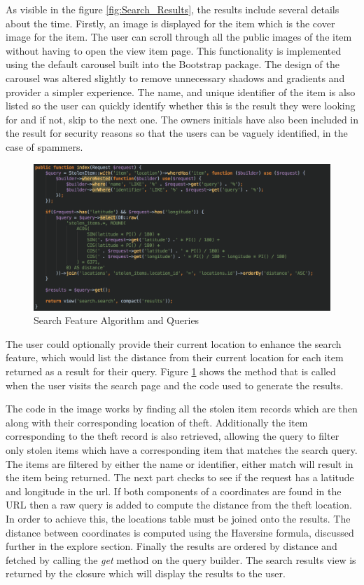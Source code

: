 As visible in the figure \ref{fig:Search_Results}, the results include several details about the time. Firstly, an image is displayed for the item which is the cover image for the item. The user can scroll through all the public images of the item without having to open the view item page. This functionality is implemented using the default carousel built into the Bootstrap package. The design of the carousel was altered slightly to remove unnecessary shadows and gradients and provider a simpler experience. The name, and unique identifier of the item is also listed so the user can quickly identify whether this is the result they were looking for and if not, skip to the next one. The owners initials have also been included in the result for security reasons so that the users can be vaguely identified, in the case of spammers.

\begin{figure}[H]
	\centering
	\includegraphics[width=1.0\textwidth]{images/Code/Search}
	\caption{Search Feature Algorithm and Queries} \label{fig:Search_Code}
\end{figure}

The user could optionally provide their current location to enhance the search feature, which would list the distance from their current location for each item returned as a result for their query. Figure \ref{fig:Search_Code} shows the method that is called when the user visits the search page and the code used to generate the results. 

The code in the image works by finding all the stolen item records which are then along with their corresponding location of theft. Additionally the item corresponding to the theft record is also retrieved, allowing the query to filter only stolen items which have a corresponding item that matches the search query. The items are filtered by either the name or identifier, either match will result in the item being returned. The next part checks to see if the request has a latitude and longitude in the url. If both components of a coordinates are found in the URL then a raw query is added to compute the distance from the theft location. In order to achieve this, the locations table must be joined onto the results. The distance between coordinates is computed using the Haversine formula, discussed further in the explore section. Finally the results are ordered by distance and fetched by calling the \emph{get} method on the query builder. The search results view is returned by the closure which will display the results to the user.

